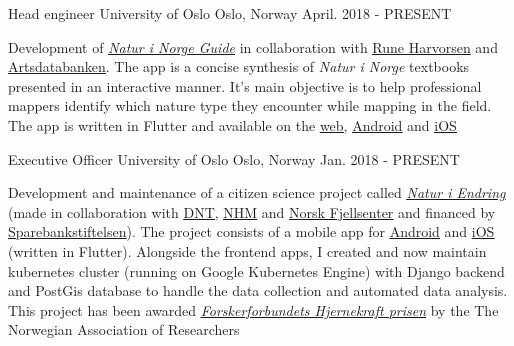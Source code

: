 
\begin{cventries}
  \cventry
    {Head engineer} %
    {University of Oslo} %
    {Oslo, Norway} %
    {April. 2018 - PRESENT} %
    {
      \begin{cvitems} %
        \item {Development of \textit{\underline{\href{https://l.ead.me/batwGC}{Natur i Norge Guide}}} in collaboration with \underline{\href{https://www.nhm.uio.no/om/organisasjon/forskning-samlinger/personer/runeho/}{Rune Harvorsen}} and \underline{\href{https://www.artsdatabanken.no/}{Artsdatabanken}}. The app is a concise synthesis of \textit{Natur i Norge} textbooks presented in an interactive manner. It's main objective is to help professional mappers identify which nature type they encounter while mapping in the field. The app is written in Flutter and available on the \underline{\href{https://natur-i-norge.no/}{web}}, \underline{\href{https://play.google.com/store/apps/details?id=no.naturinorge.naturinorge_guide}{Android}} and \underline{\href{https://apps.apple.com/us/app/natur-i-norge-guide/id1495898327}{iOS}}}
      \end{cvitems}
    }
  \cventry
    {Executive Officer} %
    {University of Oslo} %
    {Oslo, Norway} %
    {Jan. 2018 - PRESENT} %
    {
      \begin{cvitems} %
        \item {Development and maintenance of a citizen science project called \textit{\underline{\href{https://naturiendring.no}{Natur i Endring}}} (made in collaboration with \underline{\href{https://www.dnt.no/}{DNT}}, \underline{\href{https://www.nhm.uio.no/}{NHM}} and \underline{\href{https://www.norskfjellsenter.no/}{Norsk Fjellsenter}} and financed by \underline{\href{https://www.sparebankstiftelsen.no/no}{Sparebankstiftelsen}}). The project consists of a mobile app for \underline{\href{https://play.google.com/store/apps/details?id=no.naturiendring.naturiendring}{Android}} and \underline{\href{https://itunes.apple.com/us/app/natur-i-endring/id1382400241?mt=8&uo=4}{iOS}} (written in Flutter). Alongside the frontend apps, I created and now maintain kubernetes cluster (running on Google Kubernetes Engine) with Django backend and PostGis database to handle the data collection and automated data analysis. This project has been awarded \textit{\underline{\href{https://www.forskerforbundet.no/om-oss/hjernekraftprisen/vinnere/2019-vinnerbidragene/}{Forskerforbundets Hjernekraft prisen}}} by the The Norwegian Association of Researchers}
      \end{cvitems}
    }




\end{cventries}
